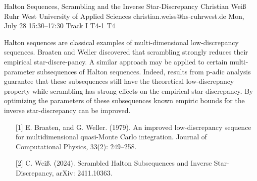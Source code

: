 \begin{talk}
  {Halton Sequences, Scrambling and the Inverse Star-Discrepancy}%
  {Christian Wei\ss{}}%
  {Ruhr West University of Applied Sciences}%
  {christian.weiss@hs-ruhrwest.de}%
  {}%
  {}%
  {Mon, July 28 15:30–17:30 Track I}%
  {T4-1}%
  {T4}%
  {}%
  
				
			
Halton sequences are classical examples of multi-dimensional low-discrepancy sequences. Braaten and Weller discovered that scrambling strongly reduces their empirical star-discre-pancy. A similar approach may be applied to certain multi-parameter subsequences of Halton sequences. Indeed, results from p-adic analysis guarantee that these subsequences still have the theoretical low-discrepancy property while scrambling has strong effects on the empirical star-discrepancy. By optimizing the parameters of these subsequences known empiric bounds for the inverse star-discrepancy can be improved.

\medskip


\begin{enumerate}
	\item[{[1]}] E. Braaten, and G. Weller. (1979). An improved low-discrepancy sequence for multidimensional quasi-Monte Carlo integration. Journal of Computational Physics, 33(2): 249–258.
	\item[{[2]}] C. Wei\ss{}. (2024). Scrambled Halton Subsequences and Inverse Star-Discrepancy, arXiv: 2411.10363. 
\end{enumerate}

\end{talk}

